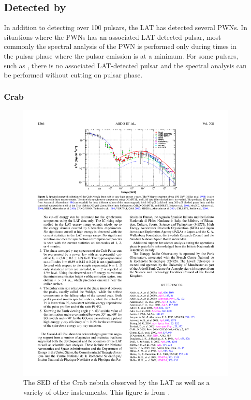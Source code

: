 \subsection{ Detected by }

In addition to detecting over 100 pulsars, the \ac{LAT} has detected
several \acp{PWN}.  In situations where the \acp{PWN} has an associated
\ac{LAT}-detected pulsar, most commonly the spectral analysis of the
\ac{PWN} is performed only during times in the pulsar phase where the
pulsar emission is at a minimum. For some pulsars, such as ,
there is no associated \ac{LAT}-detected pulsar and the spectral analysis
can be performed without cutting on pulsar phase.

\subsubsection{Crab}

\begin{figure}[htbp]
  \centering
    \includegraphics{chapters/introduction/figures/crab_spectrum.pdf}
  \caption{
    The \ac{SED} of the Crab nebula observed by the \ac{LAT} as
    well as a variety of other instruments.
    This figure is from \cite{abdo_2010a_fermi-large}.
  }
\end{figure}

